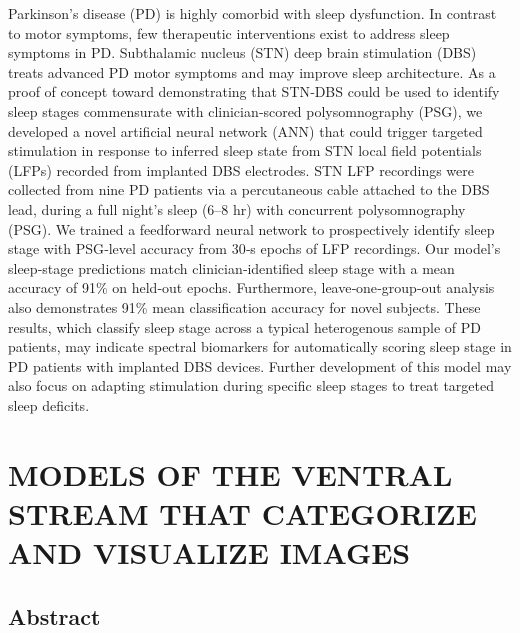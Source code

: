 \documentclass{templates/ucdenverthesis}
\begin{document}
Parkinson's disease (PD) is highly comorbid with sleep dysfunction. In contrast to motor symptoms, few therapeutic interventions exist to address sleep symptoms in PD. Subthalamic nucleus (STN) deep brain stimulation (DBS) treats advanced PD motor symptoms and may improve sleep architecture. As a proof of concept toward demonstrating that STN‐DBS could be used to identify sleep stages commensurate with clinician‐scored polysomnography (PSG), we developed a novel artificial neural network (ANN) that could trigger targeted stimulation in response to inferred sleep state from STN local field potentials (LFPs) recorded from implanted DBS electrodes. STN LFP recordings were collected from nine PD patients via a percutaneous cable attached to the DBS lead, during a full night's sleep (6--8 hr) with concurrent polysomnography (PSG). We trained a feedforward neural network to prospectively identify sleep stage with PSG‐level accuracy from 30‐s epochs of LFP recordings. Our model's sleep‐stage predictions match clinician‐identified sleep stage with a mean accuracy of 91\% on held‐out epochs. Furthermore, leave‐one‐group‐out analysis also demonstrates 91\% mean classification accuracy for novel subjects. These results, which classify sleep stage across a typical heterogenous sample of PD patients, may indicate spectral biomarkers for automatically scoring sleep stage in PD patients with implanted DBS devices. Further development of this model may also focus on adapting stimulation during specific sleep stages to treat targeted sleep deficits.

\hypertarget{ch4:intro}{%
\chapter{MODELS OF THE VENTRAL STREAM THAT CATEGORIZE AND VISUALIZE IMAGES}\label{ch4:intro}}

\hypertarget{abstract-1}{%
\section*{Abstract}\label{abstract-1}}
\end{document}
